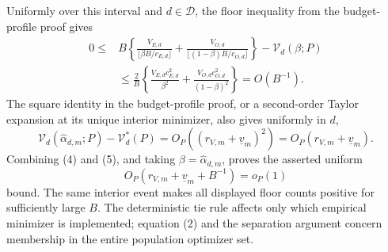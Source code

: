 Uniformly over this interval and \(d\in\mathcal D\), the floor inequality from the budget-profile proof gives
\[
\begin{aligned}
0\le{}&B\left\{\frac{V_{E,d}}{\lfloor\beta B/c_{E,d}\rfloor}
 +\frac{V_{O,d}}{\lfloor(1-\beta)B/c_{O,d}\rfloor}\right\}
 -\mathcal V_d(\beta;P)\\
&\le\frac2B\left\{\frac{V_{E,d}c_{E,d}^2}{\beta^2}
 +\frac{V_{O,d}c_{O,d}^2}{(1-\beta)^2}\right\}=O(B^{-1}).
\end{aligned} \tag{4}
\]
The square identity in the budget-profile proof, or a second-order Taylor expansion at its unique interior minimizer, also gives uniformly in \(d\),
\[
 \mathcal V_d(\widehat\alpha_{d,m};P)-\mathcal V_d^*(P)
 =O_P\!\left((r_{V,m}+\underline v_m)^2\right)
 =O_P(r_{V,m}+\underline v_m). \tag{5}
\]
Combining (4) and (5), and taking \(\beta=\widehat\alpha_{d,m}\), proves the asserted uniform
\[
 O_P(r_{V,m}+\underline v_m+B^{-1})=o_P(1)
\]
bound.  The same interior event makes all displayed floor counts positive for sufficiently large \(B\).  The deterministic tie rule affects only which empirical minimizer is implemented; equation (2) and the separation argument concern membership in the entire population optimizer set.